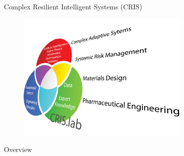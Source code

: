 
\begin{frame}{Complex Resilient Intelligent Systems (CRIS)}
	\begin{figure}[htbp]
	   \centering
	   \includegraphics[width=0.75\textwidth]{fig/download/CrisResearch720.png}
	\end{figure}
\end{frame}

\begin{frame}{Overview}
	\tableofcontents
\end{frame}